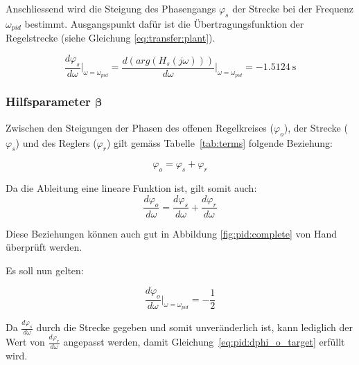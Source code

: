 Anschliessend   wird   die   Steigung    des   Phasengangs   $\varphi_s$   der
Strecke  bei  der   Frequenz  $\omega_{pid}$  bestimmt. Ausgangspunkt  daf\"ur
ist   die    \"Ubertragungsfunktion   der   Regelstrecke    (siehe   Gleichung
\ref{eq:transfer:plant}).

\begin{equation} \label{eq:transfer:plant:derivative}
    \frac{d\varphi_s}{d\omega} \biggr \rvert_{\omega=\omega_{pid}}
        = \frac{d(arg(H_s(j\omega)))}{d\omega} \biggr \rvert_{\omega=\omega_{pid}}
        = \SI{-1.5124}{\second}
\end{equation}


\subsubsection{Hilfsparameter $\boldsymbol{\beta}$}

Zwischen  den Steigungen  der Phasen  des offenen  Regelkreises ($\varphi_o$),
der  Strecke  ($\varphi_s$)  und   des  Reglers  ($\varphi_r$)  gilt  gem\"ass
Tabelle~\ref{tab:terms} folgende Beziehung:

\begin{equation} \label{eq:pid:phi_sum}
    \varphi_o = \varphi_s + \varphi_r
\end{equation}

Da die Ableitung eine lineare Funktion ist, gilt somit auch:
\begin{equation} \label{eq:pid:dphi_sum}
    \frac{d\varphi_o}{d\omega} = \frac{d\varphi_s}{d\omega} + \frac{d\varphi_r}{d\omega}
\end{equation}

Diese Beziehungen  k\"onnen auch  gut in Abbildung  \ref{fig:pid:complete} von
Hand \"uberpr\"uft werden.

Es soll nun gelten:

\begin{equation} \label{eq:pid:dphi_o_target}
    \frac{d\varphi_o}{d\omega} \biggr \rvert_{\omega=\omega_{pid}} = - \frac{1}{2}
\end{equation}

Da   $\frac{d\varphi_s}{d\omega}$  durch   die  Strecke   gegeben  und   somit
unver\"anderlich ist, kann lediglich der Wert von $\frac{d\varphi_r}{d\omega}$
angepasst werden, damit Gleichung~\ref{eq:pid:dphi_o_target} erf\"ullt wird.

